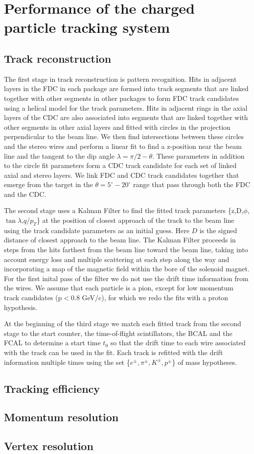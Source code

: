 \section[Performance of the charged particle tracking system (Simon)]{Performance of the charged particle tracking system}
\subsection{Track reconstruction}

The first stage in track reconstruction is pattern recognition.  Hits in adjacent
 layers in the FDC in each package are formed into track segments that are 
linked together with other segments in other packages to form FDC track 
candidates using a helical model for the track parameters.
Hits in adjacent rings in the axial layers of the CDC are also associated into 
segments that are linked together with other segments in other axial layers
and fitted with circles in the projection perpendicular to the beam line. We 
then find intersections between these circles and the stereo wires and perform 
a linear fit to find a z-position near the beam line and the tangent to the dip
 angle $\lambda=\pi/2-\theta$.  These parameters in addition to the circle fit 
parameters form a CDC track candidate for each set of linked axial and stereo 
layers.   We link FDC and CDC track candidates together that emerge from the 
target in the $\theta=5^\circ-20^\circ$ range that pass through both the FDC 
and the CDC.

The second stage uses a Kalman Filter \cite{} to find the fitted track parameters
\{z,D,$\phi$,$\tan\lambda$,$q/p_T$\}
at the position of closest approach of the track to the beam line using the 
track candidate parameters as an initial guess.  Here $D$ is the signed 
distance of closest approach to the beam line.  The Kalman Filter proceeds in 
steps from
the hits farthest from the beam line toward the beam line, taking into account
energy loss and multiple scattering at each step along the way and incorporating
a map of the magnetic field within the bore of the solenoid magnet.  For the 
first 
inital pass of the filter we do not use the drift time information from the 
wires.  We assume that each particle is a pion, except for low momentum track 
candidates (p$<$0.8 GeV/c), for which we redo the fits with a proton hypothesis.

At the beginning of the third stage we match each fitted track from the second 
stage to the start counter, the time-of-flight scintillators, the BCAL and the 
FCAL to determine a start time $t_0$ so that the drift time to each wire 
associated with the track can be used in the fit.  Each track is refitted with
the drift information multiple times using the set \{$e^\pm,\pi^\pm,K^\pm,p^\pm$\} 
of mass hypotheses.

\subsection{Tracking efficiency}
\subsection{Momentum resolution}
\subsection{Vertex resolution}
